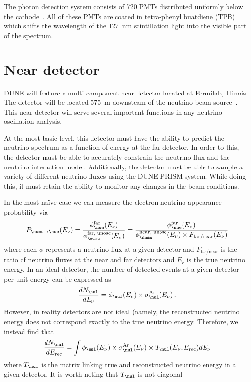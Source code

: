 The photon detection system consists of 720 PMTs distributed uniformly below the cathode~\cite{idrVol3}.
All of these PMTs are coated in tetra-phenyl buatdiene (TPB) which shifts the wavelength of the \SI{127}{\nano\metre} scintillation light into the visible part of the spectrum.

\section{Near detector}
\label{sec:dune:nd}

DUNE will feature a multi-component near detector located at Fermilab, Illinois.
The detector will be located \SI{575}{\metre} downsteam of the neutrino beam source~\cite{tdrVol1}.
This near detector will serve several important functions in any neutrino oscillation analysis.

At the most basic level, this detector must have the ability to predict the neutrino spectrum as a function of energy at the far detector.
In order to this, the detector must be able to accurately constrain the neutrino flux and the neutrino interaction model.
Additionally, the detector must be able to sample a variety of different neutrino fluxes using the DUNE-PRISM system.
While doing this, it must retain the ability to monitor any changes in the beam conditions.

In the most na\"ive case we can measure the electron neutrino appearance probability via
\begin{equation}
  P_{\numu\rightarrow\nue} (E_{\nu}) = \frac{ \phi^{\text{far}}_{\nue} (E_{\nu}) }{ \phi^{\text{far, unosc}}_{\numu} (E_{\nu}) } = \frac{ \phi^{\text{far}}_{\nue} (E_{\nu}) }{ \phi^{\text{near, unosc}}_{\numu} (E_{\nu}) \times F_{\text{far/near}}(E_{\nu}) }
\end{equation}
where each $\phi$ represents a neutrino flux at a given detector and $F_{\text{far/near}}$ is the ratio of neutrino fluxes at the near and far detectors and $E_{\nu}$ is the true neutrino energy.
In an ideal detector, the number of detected events at a given detector per unit energy can be expressed as
\begin{equation}
\frac{ dN_{\nul} }{ dE_{\nu} } = \phi_{\nul}(E_{\nu}) \times \sigma^{\text{Ar}}_{\nul} (E_{\nu})\, .
\end{equation}
However, in reality detectors are not ideal (namely, the reconstructed neutrino energy does not correspond exactly to the true neutrino energy.
Therefore, we instead find that
\begin{equation}
  \frac{ dN_{\nul} }{ dE_{\text{rec}} } = \int \phi_{\nul}(E_{\nu}) \times \sigma_{\nul}^{\text{Ar}} (E_{\nu}) \times T_{\nul}(E_{\nu},E_{\text{rec}}) dE_{\nu}
\end{equation}
where $T_{\nul}$ is the matrix linking true and reconstructed neutrino energy in a given detector.
It is worth noting that $T_{\nul}$ is not diagonal.

